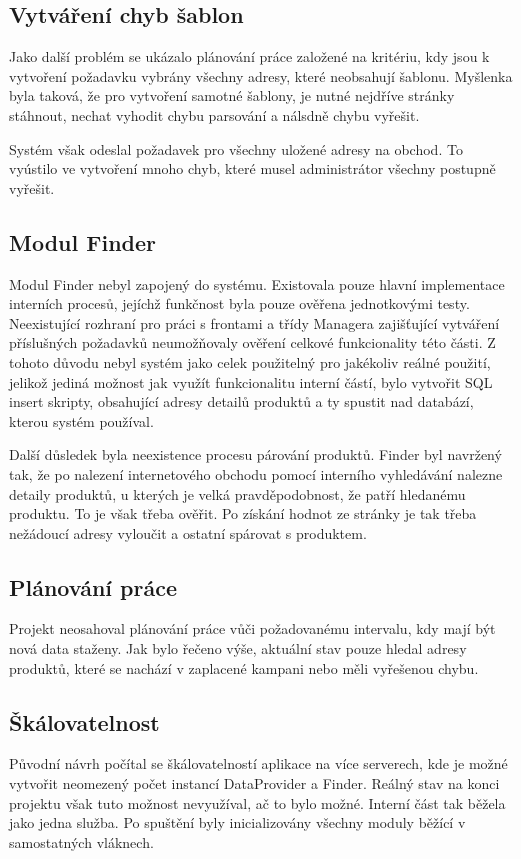 \documentclass[thesis=B,czech]{FITthesis}[2012/06/26]
\begin{document}
\subsection{Vytváření chyb šablon}
Jako další problém se ukázalo plánování práce založené na kritériu, kdy jsou k vytvoření požadavku vybrány všechny adresy, které neobsahují šablonu.
Myšlenka byla taková, že pro vytvoření samotné šablony, je nutné nejdříve stránky stáhnout, nechat vyhodit chybu parsování
a nálsdně chybu vyřešit.
\par
Systém však odeslal požadavek pro všechny uložené adresy na obchod. To vyústilo ve vytvoření mnoho chyb, 
které musel administrátor všechny postupně vyřešit.
\par
\subsection{Modul Finder}
Modul Finder nebyl zapojený do systému. Existovala pouze hlavní implementace interních procesů, jejíchž funkčnost byla
pouze ověřena jednotkovými testy. Neexistující rozhraní pro práci s frontami a třídy Managera zajišťující vytváření příslušných požadavků
neumožňovaly ověření celkové funkcionality této části. Z tohoto důvodu nebyl systém jako celek použitelný pro jakékoliv reálné použití, jelikož
jediná možnost jak využít funkcionalitu interní částí, bylo vytvořit SQL insert skripty, obsahující adresy detailů produktů
a ty spustit nad databází, kterou systém používal.
\par
Další důsledek byla neexistence procesu párování produktů. Finder byl navržený tak, že po nalezení internetového obchodu
pomocí interního vyhledávání nalezne detaily produktů, u kterých je velká pravděpodobnost, že patří hledanému produktu.
To je však třeba ověřit. Po získání hodnot ze stránky je tak třeba nežádoucí adresy vyloučit a ostatní spárovat s produktem.
\subsection{Plánování práce}
Projekt neosahoval plánování práce vůči požadovanému intervalu, kdy mají být nová data
staženy. Jak bylo řečeno výše, aktuální stav pouze hledal adresy produktů, které se nachází v zaplacené kampani nebo měli vyřešenou chybu.
\subsection{Škálovatelnost}
Původní návrh počítal se škálovatelností aplikace na více serverech, kde je možné vytvořit neomezený počet instancí DataProvider a Finder. Reálný stav
na konci projektu však tuto možnost nevyužíval, ač to bylo možné. Interní část tak běžela jako jedna služba. Po spuštění
byly inicializovány všechny moduly běžící v samostatných vláknech.
\end{document}
